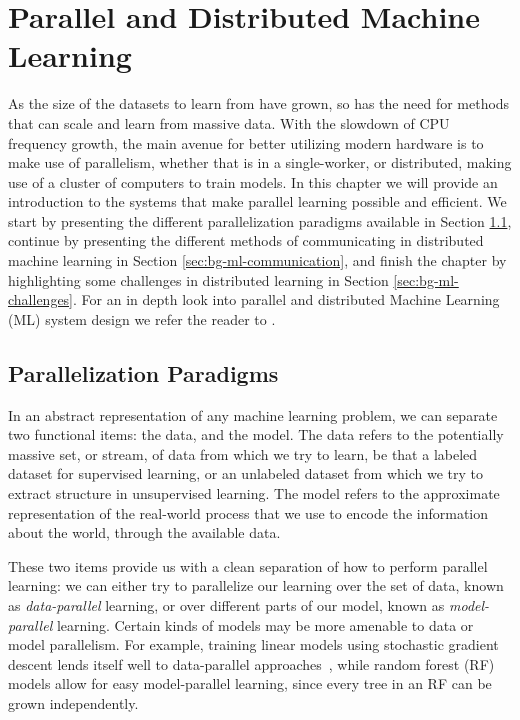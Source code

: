 \chapter{Parallel and Distributed Machine Learning}
\label{ch:bg-parallel-ml}

As the size of the datasets to learn from have grown, so has the need for methods that
can scale and learn from massive data. With the slowdown of CPU frequency
growth, the main avenue for better utilizing modern hardware is to make use
of parallelism, whether that is in a single-worker, or distributed,
making use of a cluster of computers to train models. In this chapter we
will provide an introduction to the systems that make
parallel learning possible and efficient. We start by presenting the
different parallelization paradigms available in Section \ref{sec:bg-ml-paradigms},
continue by presenting the different methods of communicating in
distributed machine learning in Section \ref{sec:bg-ml-communication},
and finish the chapter by highlighting some challenges in
distributed learning in Section \ref{sec:bg-ml-challenges}.
For an in depth look into parallel and distributed Machine Learning (ML)
system design we refer the reader to \cite{distributed-ml-design}.

\section{Parallelization Paradigms}
\label{sec:bg-ml-paradigms}

In an abstract representation of any machine learning problem, we can separate
two functional items: the data, and the model. The data refers to the potentially
massive set, or stream, of data from which we try to learn, be that a labeled dataset for
supervised learning, or an unlabeled dataset from which we try to extract
structure in unsupervised learning. The model refers to the approximate representation
of the real-world process that we use to encode the information about the world,
through the available data.

These two items provide us with a clean separation of how to perform
parallel learning: we can either try to parallelize our learning over the set
of data, known as \emph{data-parallel} learning, or over different parts of
our model, known as \emph{model-parallel} learning. Certain kinds of models
may be more amenable to data or model parallelism. For example, training
linear models using stochastic gradient descent lends itself well to
data-parallel approaches~\cite{dekel-optimal-distributed}, while random
forest (RF) models allow for easy model-parallel learning,
since every tree in an RF can be grown independently.

